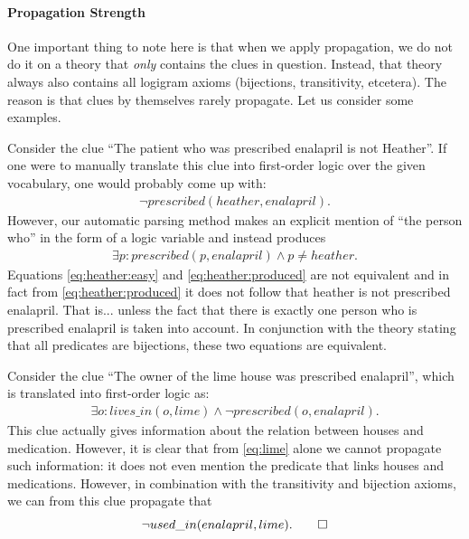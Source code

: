 


\paragraph{Propagation Strength}
One important thing to note here is that when we apply propagation, we do not do it on a theory that \emph{only} contains the clues in question. Instead, that theory always also contains all logigram axioms (bijections, transitivity, etcetera). 
The reason is that clues by themselves rarely propagate. Let us consider some examples. 
\begin{example}
 Consider the clue ``The patient who was prescribed enalapril is not Heather''. If one were to manually translate this clue into first-order logic over the given vocabulary, one would probably come up with: 
 \begin{align}\lnot \mathit{prescribed}(heather,enalapril).\label{eq:heather:easy}\end{align}
 However, our automatic parsing method makes an explicit mention of ``the person who'' in the form of a logic variable and instead produces 
 \begin{align}
  \exists p: prescribed(p,enalapril) \land p \neq heather.\label{eq:heather:produced}
\end{align}
Equations \eqref{eq:heather:easy} and \eqref{eq:heather:produced} are not equivalent and in fact from \eqref{eq:heather:produced} it does not follow that heather is not prescribed enalapril. That is... unless the fact that there is exactly one person who is prescribed enalapril is taken into account. In conjunction with the theory stating that all predicates are bijections, these two equations are equivalent. 
% 
% 
\end{example}

\begin{example}
 Consider the clue ``The owner of the lime house was prescribed enalapril'', which is translated into first-order logic as:
 \begin{align}
\exists o: lives\_in(o,lime) \land \lnot prescribed(o,enalapril).   \label{eq:lime}
 \end{align}
 This clue actually gives information about the relation between houses and medication. However, it is clear that from \eqref{eq:lime} alone we cannot propagate such information: it does not even mention the predicate that links houses and medications. 
 However, in combination with the transitivity and bijection axioms, we can from this clue propagate that 
 \[\lnot used\_in(enalapril,lime).\qedhere\]
\end{example}

